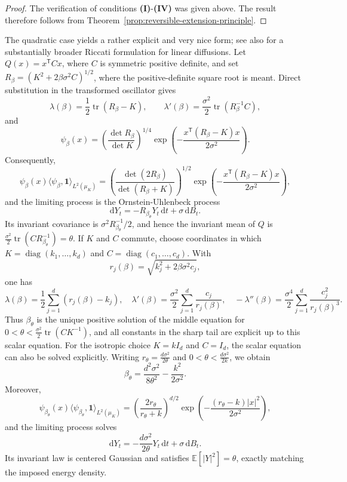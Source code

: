 \documentclass[11pt,reqno]{amsart}
\theoremstyle{definition}
\numberwithin{equation}{section}
\newcommand{\<}{\langle}
\renewcommand{\>}{\rangle}
\def\de{{\rm d}}
\def\de{{\mathrm {d}}}
\begin{document}
\begin{proof}
The verification of conditions \textbf{(I)}-\textbf{(IV)} was given
above.  The result therefore follows from
Theorem~\ref{prop:reversible-extension-principle}.
\end{proof}
The quadratic case yields a rather explicit and very nice form; see also
\cite{DelMoralHorton} for a substantially broader Riccati formulation for
linear diffusions.  Let
$Q(x)=x^{\mathsf T}Cx$, where $C$ is symmetric positive definite, and set
$R_\beta=(K^2+2\beta\sigma^2C)^{1/2}$, where the positive-definite square root is meant.  Direct substitution in
the transformed oscillator gives
\[
    \lambda(\beta)
      =\frac12\operatorname{tr}(R_\beta-K),
    \qquad
    \lambda'(\beta)
      =\frac{\sigma^2}{2}\operatorname{tr}(R_\beta^{-1}C),
\]
and
\[
    \psi_\beta(x)
      =\left(\frac{\det R_\beta}{\det K}\right)^{1/4}
       \exp\!\left(
          -\frac{x^{\mathsf T}(R_\beta-K)x}{2\sigma^2}
       \right).
\]
Consequently,
\[
\psi_\beta(x)\langle\psi_\beta,\mathbf 1\rangle_{L^2(\mu_K)}
=\left(\frac{\det(2R_\beta)}{\det(R_\beta+K)}\right)^{1/2}
 \exp\!\left(
    -\frac{x^{\mathsf T}(R_\beta-K)x}{2\sigma^2}
 \right),
\]
and the limiting process is the Ornstein-Uhlenbeck process
\[
    \de Y_t=-R_{\beta_\theta}Y_t\,\de t+\sigma\,\de B_t.
\]
Its invariant covariance is $\sigma^2R_{\beta_\theta}^{-1}/2$, and hence
the invariant mean of $Q$ is $\frac{\sigma^2}{2}
    \operatorname{tr}(CR_{\beta_\theta}^{-1})=\theta$.
If $K$ and $C$ commute, choose coordinates in which
$K=\operatorname{diag}(k_1,\ldots,k_d)$ and
$C=\operatorname{diag}(c_1,\ldots,c_d)$.  With
\[
    r_j(\beta)=\sqrt{k_j^2+2\beta\sigma^2c_j},
\]
one has
\[
    \lambda(\beta)=\frac12\sum_{j=1}^d(r_j(\beta)-k_j),
    \quad
    \lambda'(\beta)=\frac{\sigma^2}{2}
       \sum_{j=1}^d\frac{c_j}{r_j(\beta)},
    \quad
    -\lambda''(\beta)=\frac{\sigma^4}{2}
       \sum_{j=1}^d\frac{c_j^2}{r_j(\beta)^3}.
\]
Thus $\beta_\theta$ is the unique positive solution of the middle equation
for $0<\theta<\frac{\sigma^2}{2} \operatorname{tr}(CK^{-1})$,
and all constants in the sharp tail are explicit up to this scalar equation.
For the isotropic choice $K=k I_d$ and $C=I_d$, the scalar equation can
also be solved explicitly.  Writing $r_\theta=\frac{d\sigma^2}{2\theta}$ and 
$0<\theta<\frac{d\sigma^2}{2k}$, 
we obtain
\[
    \beta_\theta
      =\frac{d^2\sigma^2}{8\theta^2}
       -\frac{k^2}{2\sigma^2}.
\]
Moreover,
\[
\psi_{\beta_\theta}(x)
\langle\psi_{\beta_\theta},\mathbf 1\rangle_{L^2(\mu_K)}
=\left(\frac{2r_\theta}{r_\theta+k}\right)^{d/2}
 \exp\!\left(-\frac{(r_\theta-k)|x|^2}{2\sigma^2}\right),
\]
and the limiting process solves
\[
    \de Y_t=-\frac{d\sigma^2}{2\theta}Y_t\,\de t+\sigma\,\de B_t.
\]
Its invariant law is centered Gaussian and satisfies
$\mathbb E [|Y|^2]=\theta$, exactly matching the imposed energy density.
\end{document}
